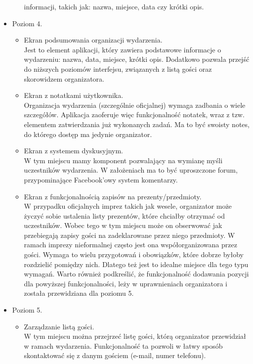 \documentclass[10pt,titlepage]{article}
\begin{document}
\begin{itemize}
\begin{itemize}
       informacji, takich jak: nazwa, miejsce, data czy krótki opis.
      \end{itemize}
 \item Poziom 4.
      \begin{itemize}
       \item Ekran podsumowania organizacji wydarzenia.
       \\Jest to element aplikacji, który zawiera podstawowe informacje o wydarzeniu: nazwa, data, miejsce, krótki opis. Dodatkowo pozwala przejść do niższych poziomów interfejsu,
       związanych z listą gości oraz skorowidzem organizatora.
       \item Ekran z notatkami użytkownika.
       \\Organizacja wydarzenia (szczególnie oficjalnej) wymaga zadbania o wiele szczegółów. Aplikacja zaoferuje więc funkcjonalność notatek, wraz z tzw. elementem
       zatwierdzania już wykonanych zadań. Ma to być swoisty notes, do którego dostęp ma jedynie organizator.
       \item Ekran z systemem dyskusyjnym.
       \\W tym miejscu mamy komponent pozwalający na wymianę myśli uczestników wydarzenia. W założeniach ma to być uproszczone forum, przypominające Facebook'owy system komentarzy.
       \item Ekran z funkcjonalnością zapisów na prezenty/przedmioty.
       \\W przypadku oficjalnych imprez takich jak wesele, organizator może życzyć sobie ustalenia listy prezentów, które chciałby otrzymać od uczestników. Wobec tego w tym miejscu
       może on obserwować jak przebiegają zapisy gości na zadeklarowane przez niego przedmioty.
       W ramach imprezy nieformalnej często jest ona współorganizowana przez gości. Wymaga to wielu przygotowań i obowiązków, które dobrze byłoby rozdzielić pomiędzy nich. 
       Dlatego też jest to idealne miejsce dla tego typu wymagań.
       Warto również podkreślić, że funkcjonalność dodawania pozycji dla powyższej funkcjonalności, leży w uprawnieniach organizatora i została przewidziana dla poziomu 5.
      \end{itemize}
 \item Poziom 5.
      \begin{itemize}
	\item Zarządzanie listą gości.
	\\W tym miejscu można przejrzeć listę gości, którą organizator przewidział w ramach wydarzenia. Funkcjonalność ta pozwoli w łatwy sposób skontaktować się z danym gościem (e-mail, numer telefonu).

\end{itemize}
\end{itemize}
\end{document}
